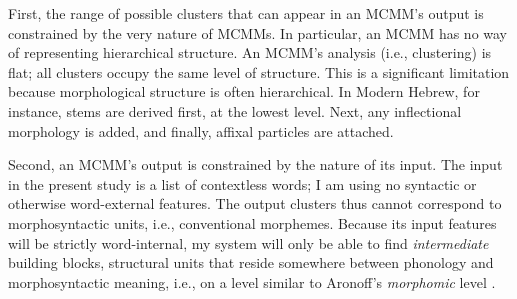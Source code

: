 First, the range of possible clusters that can appear in an MCMM's output is constrained by the very nature of MCMMs. In particular, an MCMM has no way of representing hierarchical structure.
An MCMM's analysis (i.e., clustering) is flat; all clusters occupy the same level of structure. This is a significant limitation because morphological structure is often hierarchical. In Modern Hebrew, for instance, stems are derived first, at the lowest level. Next, any inflectional morphology is added, and finally, affixal particles are attached.

Second, an MCMM's output is constrained by the nature of its input. The input in the present study is a list of contextless words; I am using no syntactic or otherwise word-external features. The output clusters thus cannot correspond to morphosyntactic units, i.e., conventional morphemes. 
Because its input features will be strictly word-internal, my system will only be able to find \emph{intermediate} building
blocks, structural units that reside somewhere between phonology and
morphosyntactic meaning, i.e., on a level similar to Aronoff's \emph{morphomic} level
\citep{aronoff:1994}.




